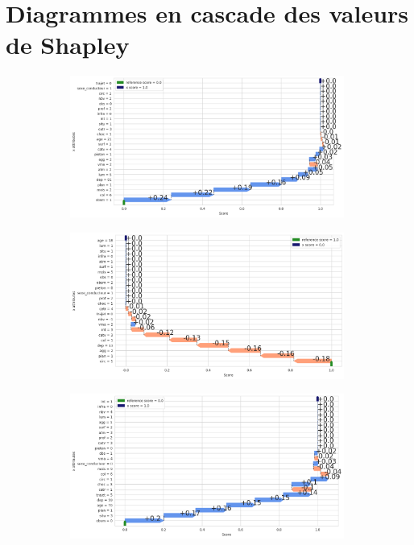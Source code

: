 \documentclass{article}
\begin{document}
    \section{Diagrammes en cascade des valeurs de Shapley}
    \begin{figure}[ht]
        \centering
        \begin{subfigure}{9cm}
            \includegraphics[width=9cm]{./img/shap10.png}
            \caption{}
        \end{subfigure}
        \begin{subfigure}{9cm}
            \includegraphics[width=9cm]{./img/shap8.png}
        \caption{}
        \end{subfigure}
        \begin{subfigure}{9cm}
            \includegraphics[width=9cm]{./img/shap9.png}
        \caption{}
        \end{subfigure}
    \end{figure}
\end{document}
